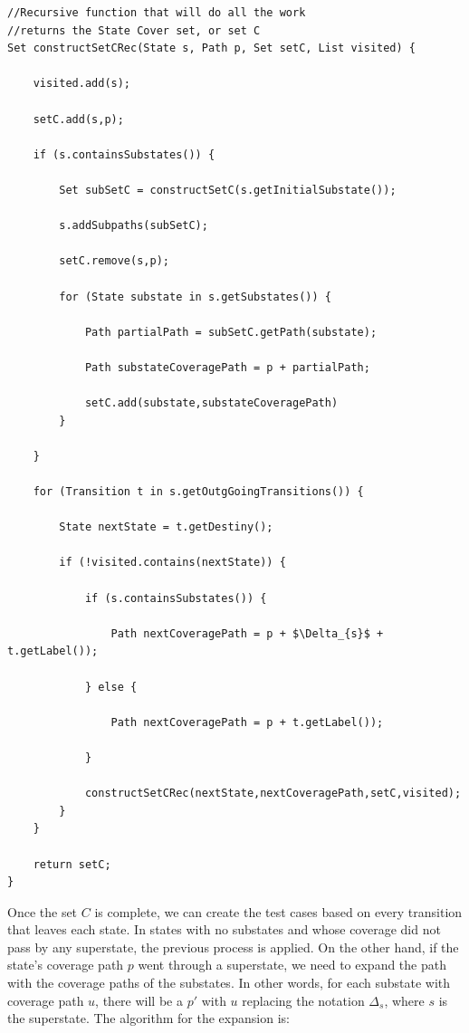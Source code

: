 \begin{lstlisting}[mathescape,caption={Recursive State Cover construction for statecharts with hierarchy}]
//Recursive function that will do all the work
//returns the State Cover set, or set C
Set constructSetCRec(State s, Path p, Set setC, List visited) {

	visited.add(s);

	setC.add(s,p);

	if (s.containsSubstates()) {

		Set subSetC = constructSetC(s.getInitialSubstate());	

		s.addSubpaths(subSetC);

		setC.remove(s,p);

		for (State substate in s.getSubstates()) {

			Path partialPath = subSetC.getPath(substate);

			Path substateCoveragePath = p + partialPath;

			setC.add(substate,substateCoveragePath)	
		}
		
	}
	
	for (Transition t in s.getOutgGoingTransitions()) {
		
		State nextState = t.getDestiny();

		if (!visited.contains(nextState)) {

			if (s.containsSubstates()) {
			
				Path nextCoveragePath = p + $\Delta_{s}$ + t.getLabel());

			} else {

				Path nextCoveragePath = p + t.getLabel());

			}	

			constructSetCRec(nextState,nextCoveragePath,setC,visited);	
		}
	}
	
	return setC;
}

\end{lstlisting}
 

Once the set $C$ is complete, we can create the test cases based on every transition that leaves each state. In states with no substates and whose coverage did not pass by any superstate, the previous process is applied.
%
On the other hand, if the state's coverage path $p$ went through a superstate, we need to expand the path with the coverage paths of the substates. In other words, for each substate with coverage path $u$,  there will be a $p'$ with $u$ replacing the notation $\Delta_s$, where $s$ is the superstate. The algorithm for the expansion is:

